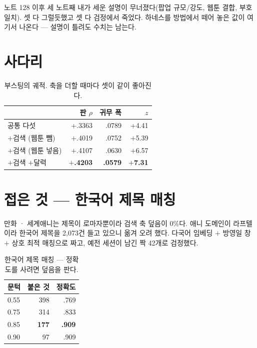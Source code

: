 \documentclass[10pt]{article}
\begin{document}
노트 128 이후 세 노트째 내가 세운 설명이 무너졌다(팝업 규모/강도, 웹툰
결합, 부호 일치). 셋 다 그럴듯했고 셋 다 검정에서 죽었다. 하네스를 방법에서
떼어 놓은 값이 여기서 나온다 --- 설명이 틀려도 수치는 남는다.

\section{사다리}

\begin{table}[t]
\centering\tsize
\caption{부스팅의 궤적. 축을 더할 때마다 셋이 같이 좋아진다.}
\begin{tabular}{lrrr}
\toprule
& 판 $\rho$ & 귀무 폭 & $z$ \\
\midrule
공통 다섯 & $+$.3363 & .0789 & $+$4.41 \\
$+$검색 (웹툰 뺌) & $+$.4019 & .0752 & $+$5.39 \\
$+$검색 (웹툰 넣음) & $+$.4107 & .0630 & $+$6.57 \\
$+$검색 $+$달력 & \textbf{$+$.4203} & \textbf{.0579} & \textbf{$+$7.31} \\
\bottomrule
\end{tabular}
\end{table}


\section{접은 것 --- 한국어 제목 매칭}

만화 · 세계애니는 제목이 로마자뿐이라 검색 축 덮음이 0\%다. 애니 도메인이
라프텔이라 한국어 제목을 2{,}073건 들고 있으니 옮겨 오려 했다. 다국어
임베딩 $+$ 방영일 창 $+$ 상호 최적 매칭으로 짜고, 예전 세션이 남긴 짝
42개로 검정했다.

\begin{table}[t]
\centering\tsize
\caption{한국어 제목 매칭 --- 정확도를 사려면 덮음을 판다.}
\begin{tabular}{lrr}
\toprule
문턱 & 붙은 것 & 정확도 \\
\midrule
0.55 & 398 & .769 \\
0.75 & 314 & .833 \\
0.85 & \textbf{177} & \textbf{.909} \\
0.90 & 97 & .909 \\
\bottomrule
\end{tabular}
\end{table}
\end{document}
